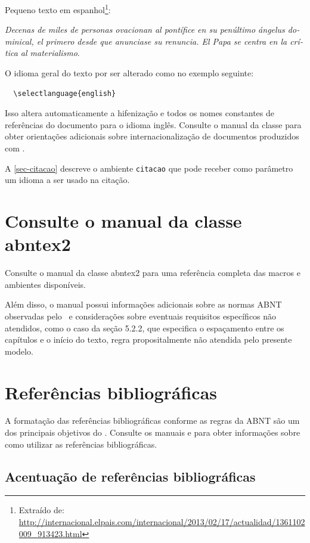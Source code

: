 Pequeno texto em espanhol\footnote{Extraído de:
\url{http://internacional.elpais.com/internacional/2013/02/17/actualidad/1361102009_913423.html}}:

\foreignlanguage{spanish}{\textit{Decenas de miles de personas ovacionan al pontífice en su
penúltimo ángelus dominical, el primero desde que anunciase su renuncia. El Papa se
centra en la crítica al materialismo}}.

O idioma geral do texto por ser alterado como no exemplo seguinte:

\begin{verbatim}
  \selectlanguage{english}
\end{verbatim}

Isso altera automaticamente a hifenização e todos os nomes constantes de
referências do documento para o idioma inglês. Consulte o manual da classe
\cite{abntex2classe} para obter orientações adicionais sobre internacionalização de
documentos produzidos com \abnTeX.

A \autoref{sec-citacao} descreve o ambiente \texttt{citacao} que pode receber
como parâmetro um idioma a ser usado na citação.

\section{Consulte o manual da classe \textsf{abntex2}}

Consulte o manual da classe \textsf{abntex2} \cite{abntex2classe} para uma
referência completa das macros e ambientes disponíveis. 

Além disso, o manual possui informações adicionais sobre as normas ABNT
observadas pelo \abnTeX\ e considerações sobre eventuais requisitos específicos
não atendidos, como o caso da \cite{NBR14724:2011} seção 5.2.2, que
especifica o espaçamento entre os capítulos e o início do texto, regra
propositalmente não atendida pelo presente modelo.

\section{Referências bibliográficas}

A formatação das referências bibliográficas conforme as regras da ABNT são um
dos principais objetivos do \abnTeX. Consulte os manuais
\cite{abntex2cite} e \cite{abntex2cite-alf} para obter informações
sobre como utilizar as referências bibliográficas.

\subsection{Acentuação de referências bibliográficas}

